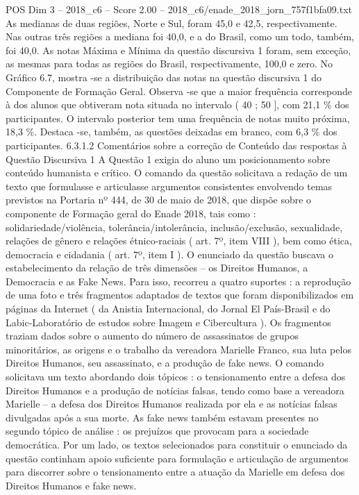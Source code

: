 \begin{textsample}{POS Dim 3 – 2018\_c6 – Score 2.00 – 2018\_c6/enade\_2018\_jorn\_757f1bfa09.txt}
As medianas de duas regiões, Norte e Sul, foram 45,0 e 42,5, respectivamente.
Nas outras três regiões a mediana foi 40,0, e a do Brasil, como um todo, também, foi 40,0.
As notas Máxima e Mínima da questão discursiva 1 foram, sem exceção, as mesmas para todas as regiões do Brasil, respectivamente, 100,0 e zero.
No Gráfico 6.7, mostra -se a distribuição das notas na questão discursiva 1 do Componente de Formação Geral.
Observa -se que a maior frequência corresponde à dos alunos que obtiveram nota situada no intervalo ( 40 ; 50 ], com 21,1 \% dos participantes.
O intervalo posterior tem uma frequência de notas muito próxima, 18,3 \%.
Destaca -se, também, as questões deixadas em branco, com 6,3 \% dos participantes. 6.3.1.2 Comentários sobre a correção de Conteúdo das respostas à Questão Discursiva 1 A Questão 1 exigia do aluno um posicionamento sobre conteúdo humanista e crítico.
O comando da questão solicitava a redação de um texto que formulasse e articulasse argumentos consistentes envolvendo temas previstos na Portaria nº 444, de 30 de maio de 2018, que dispõe sobre o componente de Formação geral do Enade 2018, tais como : solidariedade/violência, tolerância/intolerância, inclusão/exclusão, sexualidade, relações de gênero e relações étnico-raciais ( art. 7º, item VIII ), bem como ética, democracia e cidadania ( art. 7º, item I ).
O enunciado da questão buscava o estabelecimento da relação de três dimensões – os Direitos Humanos, a Democracia e as Fake News.
Para isso, recorreu a quatro suportes : a reprodução de uma foto e três fragmentos adaptados de textos que foram disponibilizados em páginas da Internet ( da Anistia Internacional, do Jornal El País-Brasil e do Labic-Laboratório de estudos sobre Imagem e Cibercultura ).
Os fragmentos traziam dados sobre o aumento do número de assassinatos de grupos minoritários, as origens e o trabalho da vereadora Marielle Franco, sua luta pelos Direitos Humanos, seu assassinato, e a produção de fake news.
O comando solicitava um texto abordando dois tópicos : o tensionamento entre a defesa dos Direitos Humanos e a produção de notícias falsas, tendo como base a vereadora Marielle – a defesa dos Direitos Humanos realizada por ela e as notícias falsas divulgadas após a sua morte.
As fake news também estavam presentes no segundo tópico de análise : os prejuízos que provocam para a sociedade democrática.
Por um lado, os textos selecionados para constituir o enunciado da questão continham apoio suficiente para formulação e articulação de argumentos para discorrer sobre o tensionamento entre a atuação da Marielle em defesa dos Direitos Humanos e fake news.

\end{textsample}
